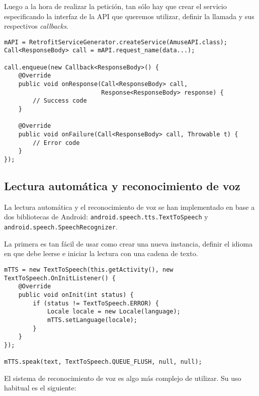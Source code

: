 Luego a la hora de realizar la petición, tan sólo hay que crear el servicio
especificando la interfaz de la API que queremos utilizar, definir la llamada y
sus respectivos \textit{callbacks}.

\begin{verbatim}
mAPI = RetrofitServiceGenerator.createService(AmuseAPI.class);
Call<ResponseBody> call = mAPI.request_name(data...);

call.enqueue(new Callback<ResponseBody>() {
    @Override
    public void onResponse(Call<ResponseBody> call,
                           Response<ResponseBody> response) {
        // Success code
    }
    
    @Override
    public void onFailure(Call<ResponseBody> call, Throwable t) {
        // Error code
    }
});
\end{verbatim}


\subsection{Lectura automática y reconocimiento de voz}

La lectura automática y el reconocimiento de voz se han implementado en base a
dos bibliotecas de Android: \texttt{android.speech.tts.TextToSpeech} y
\\ \texttt{android.speech.SpeechRecognizer}.

La primera es tan fácil de usar como crear una nueva instancia, definir el
idioma en que debe leerse e iniciar la lectura con una cadena de texto.

\begin{verbatim}
mTTS = new TextToSpeech(this.getActivity(), new TextToSpeech.OnInitListener() {
    @Override
    public void onInit(int status) {
        if (status != TextToSpeech.ERROR) {
            Locale locale = new Locale(language);
            mTTS.setLanguage(locale);
        }
    }
});

mTTS.speak(text, TextToSpeech.QUEUE_FLUSH, null, null);
\end{verbatim}

El sistema de reconocimiento de voz es algo más complejo de utilizar. Su uso
habitual es el siguiente:

